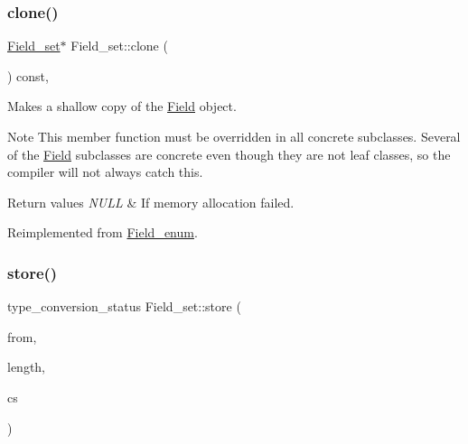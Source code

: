 \mbox{\label{classField__set_a06dc1b03bfa20901a62f344d66374f65}} 
\subsubsection{\texorpdfstring{clone()}{clone()}\hspace{0.1cm}{\footnotesize\ttfamily [2/2]}}
{\footnotesize\ttfamily \mbox{\hyperlink{classField__set}{Field\+\_\+set}}$\ast$ Field\+\_\+set\+::clone (\begin{DoxyParamCaption}{ }\end{DoxyParamCaption}) const\hspace{0.3cm}{\ttfamily [inline]}, {\ttfamily [virtual]}}

Makes a shallow copy of the \mbox{\hyperlink{classField}{Field}} object.

\begin{DoxyNote}{Note}
This member function must be overridden in all concrete subclasses. Several of the \mbox{\hyperlink{classField}{Field}} subclasses are concrete even though they are not leaf classes, so the compiler will not always catch this.
\end{DoxyNote}

\begin{DoxyRetVals}{Return values}
{\em N\+U\+LL} & If memory allocation failed. \\
\hline
\end{DoxyRetVals}


Reimplemented from \mbox{\hyperlink{classField__enum_a70a7230248a5c8c40751fe0f99f6d551}{Field\+\_\+enum}}.

\mbox{\label{classField__set_a2c74d155d4d11aac75bba6b93a08cbb3}} 
\subsubsection{\texorpdfstring{store()}{store()}\hspace{0.1cm}{\footnotesize\ttfamily [1/2]}}
{\footnotesize\ttfamily type\+\_\+conversion\+\_\+status Field\+\_\+set\+::store (\begin{DoxyParamCaption}\item[{const char $\ast$}]{from,  }\item[{size\+\_\+t}]{length,  }\item[{const C\+H\+A\+R\+S\+E\+T\+\_\+\+I\+N\+FO $\ast$}]{cs }\end{DoxyParamCaption})\hspace{0.3cm}{\ttfamily [virtual]}}


